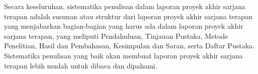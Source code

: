 Secara keseluruhan, sistematika penulisan dalam laporan proyek akhir sarjana terapan adalah susunan atau struktur dari laporan proyek akhir sarjana terapan yang menjabarkan bagian-bagian yang harus ada dalam laporan proyek akhir sarjana terapan, yang meliputi Pendahuluan, Tinjauan Pustaka, Metode Penelitian, Hasil dan Pembahasan, Kesimpulan dan Saran, serta Daftar Pustaka. Sistematika penulisan yang baik akan membuat laporan proyek akhir sarjana terapan lebih mudah untuk dibaca dan dipahami.